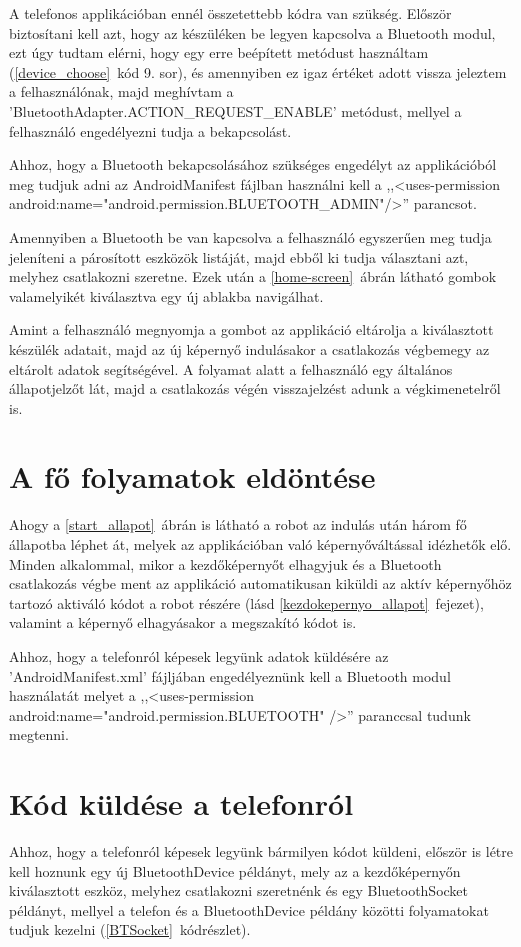 \documentclass[]{thesis-ekf}
\theoremstyle{definition}
\begin{document}
A telefonos applikációban ennél összetettebb kódra van szükség. Először biztosítani kell azt, hogy az készüléken be legyen kapcsolva a Bluetooth modul, ezt úgy tudtam elérni, hogy egy erre beépített metódust használtam\cite{Bluetooth_active} (\ref{device_choose}~kód 9. sor), és amennyiben ez igaz értéket adott vissza jeleztem a felhasználónak, majd meghívtam a 'BluetoothAdapter.ACTION\_REQUEST\_ENABLE' metódust\cite{Bluetooth_enable}, mellyel a felhasználó engedélyezni tudja a bekapcsolást. 


Ahhoz, hogy a Bluetooth bekapcsolásához szükséges engedélyt az applikációból meg tudjuk adni az AndroidManifest fájlban használni kell a ,,<uses-permission android:name="android.permission.BLUETOOTH\_ADMIN"/>'' parancsot.

Amennyiben a Bluetooth be van kapcsolva a felhasználó egyszerűen meg tudja jeleníteni a párosított eszközök listáját, majd ebből ki tudja választani azt, melyhez csatlakozni szeretne. Ezek után a \ref{home-screen}~ábrán látható gombok valamelyikét kiválasztva egy új ablakba navigálhat.

Amint a felhasználó megnyomja a gombot az applikáció eltárolja a kiválasztott készülék adatait, majd az új képernyő indulásakor a csatlakozás végbemegy az eltárolt adatok segítségével\cite{Bluetooth_connect}. A folyamat alatt a felhasználó egy általános állapotjelzőt lát, majd a csatlakozás végén visszajelzést adunk a végkimenetelről is.
\section{A fő folyamatok eldöntése}
Ahogy a \ref{start_allapot}~ábrán is látható a robot az indulás után három fő állapotba léphet át, melyek az applikációban való képernyőváltással idézhetők elő. Minden alkalommal, mikor a kezdőképernyőt elhagyjuk és a Bluetooth csatlakozás végbe ment az applikáció automatikusan kiküldi az aktív képernyőhöz tartozó aktiváló kódot a robot részére (lásd \ref{kezdokepernyo_allapot}~fejezet), valamint a képernyő elhagyásakor a megszakító kódot is.

Ahhoz, hogy a telefonról képesek legyünk adatok küldésére az 'AndroidManifest.xml' fájljában engedélyeznünk kell a Bluetooth modul használatát melyet a ,,<uses-permission android:name="android.permission.BLUETOOTH" />'' paranccsal tudunk megtenni.
\section{Kód küldése a telefonról}
Ahhoz, hogy a telefonról képesek legyünk bármilyen kódot küldeni, először is létre kell hoznunk egy új BluetoothDevice példányt, mely az a kezdőképernyőn kiválasztott eszköz, melyhez csatlakozni szeretnénk és egy BluetoothSocket példányt, mellyel a telefon és a BluetoothDevice példány közötti folyamatokat tudjuk kezelni (\ref{BTSocket}~kódrészlet).

\end{document}
